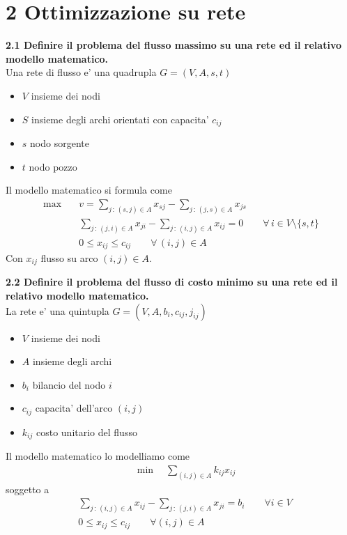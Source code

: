 \documentclass[a4paper,11pt]{article}
\newcommand{\domanda}[2]{%
  \vspace{0.6em}
  \noindent\textbf{#1}\\[0.2em]
  \noindent#2
  \vspace{1em}
  \par
}
\begin{document}
\section{2 \quad Ottimizzazione su rete}

\domanda{2.1 \quad Definire il problema del flusso massimo su una rete ed il relativo modello matematico.}{
Una rete di flusso e' una quadrupla $G=(V, A, s, t)$ 
\begin{itemize}
    \item $V$ insieme dei nodi
    \item $S$ insieme degli archi orientati con capacita' $c_{ij}$
    \item $s$ nodo sorgente
    \item $t$ nodo pozzo
\end{itemize}
Il modello matematico si formula come 
\begin{align*}
    \max \quad & v = \sum_{j \,:\, (s,j) \in A} x_{sj} - \sum_{j \,:\, (j,s) \in A} x_{js} \\[6pt]
    & \sum_{j \,:\, (j,i) \in A} x_{ji} - \sum_{j \,:\, (i,j) \in A} x_{ij} = 0
      \qquad \forall\, i \in V \setminus \{s, t\} \\[4pt]
    & 0 \leq x_{ij} \leq c_{ij} \qquad \forall\, (i,j) \in A
\end{align*}
Con $x_{ij}$ flusso su arco $(i,j) \in A$.
}

\domanda{2.2 \quad Definire il problema del flusso di costo minimo su una rete ed il relativo modello matematico.}{
La rete e' una quintupla $G=(V, A, b_i, c_{ij}, j_{ij})$
\begin{itemize}
    \item $V$ insieme dei nodi
    \item $A$ insieme degli archi
    \item $b_i$ bilancio del nodo $i$
    \item $c_{ij}$ capacita' dell'arco $(i,j)$
    \item $k_{ij}$ costo unitario del flusso
\end{itemize}
Il modello matematico lo modelliamo come
\begin{align*}
    &\min \quad \sum_{(i,j) \in A} k_{ij}x_{ij}
\end{align*}
soggetto a
\begin{align*}
    & \sum_{j \,:\, (i,j) \in A} x_{ij} - \sum_{j \,:\, (j,i) \in A} x_{ji} = b_i \qquad \forall i \in V\\
    &0 \leq x_{ij} \leq c_{ij} \qquad \forall (i,j) \in A
\end{align*}
}
\end{document}
